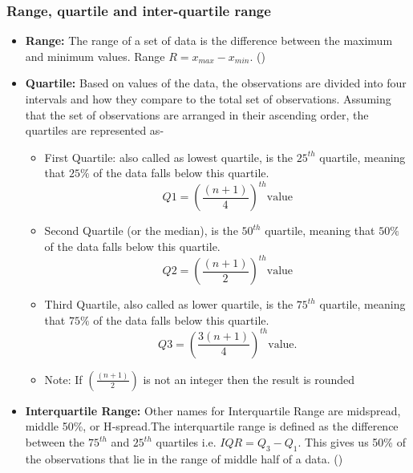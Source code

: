 \documentclass[12 pt]{scrartcl}
\begin{document}
	\subsubsection{Range, quartile and inter-quartile range}
	\begin{itemize}
		\item \textbf{Range:} The range of a set of data is the difference between the maximum and minimum values. Range $R=x_{max}-x_{min}$. (\cite{Christ})
		
		
		\item \textbf{Quartile:} Based on values of the data, the observations are divided into four intervals and how they compare to the total set of observations. Assuming that the set of observations are arranged in their ascending order, the quartiles are represented as-
		
		
		\begin{itemize}
			\item First Quartile: also called as lowest quartile, is 	the $25^{th}$ quartile, meaning that $ 25\% $ of the data falls below 	this quartile.
			\begin{equation*}
				Q1 = (\frac{(n + 1)}{4})^{th} \text{value}
			\end{equation*}	
			\item Second Quartile (or the median), is 	the $50^{th}$ quartile, meaning that $ 50\% $ of the data falls below 	this quartile.
			\begin{equation*}
				Q2 = (\frac{(n + 1)}{2})^{th} \text{value}
			\end{equation*}
			\item Third Quartile, also called as lower quartile, is 	the $75^{th}$ quartile, meaning that $ 75\% $ of the data falls below 	this quartile.
			\begin{equation*}
				Q3 = (\frac{3(n + 1)}{4})^{th} \text{value}.
			\end{equation*}
			\item Note: If $(\frac{(n + 1)}{2})$ is not an integer then the result is rounded 
		\end{itemize}
		
		
		
		
		\item \textbf{Interquartile Range:} Other names for Interquartile Range are midspread, middle 50\%, or H‑spread.The interquartile range is defined as the difference between the $75^{th}$ and $25^{th}$ quartiles i.e. $IQR= Q_{3}-Q_{1}$. This gives us 50\% of the observations that lie in the range of middle half of a data. 	(\cite{text}) 
	\end{itemize}
	
\end{document}
